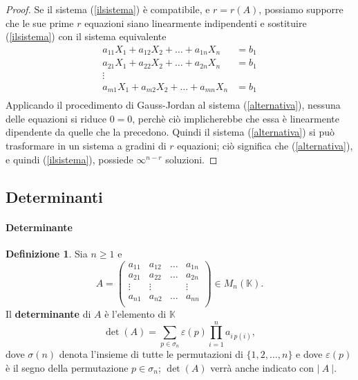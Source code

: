 \documentclass{article}
\theoremstyle{plain}
\theoremstyle{definition}
\newtheorem{defn}{Definizione}[section]
\theoremstyle{remark}
\begin{document}
\begin{proof}
    Se il sistema (\ref{ilsistema}) è compatibile, e $r=r(A)$, possiamo supporre che le sue prime $r$ equazioni siano linearmente indipendenti e sostituire (\ref{ilsistema}) con il sistema equivalente
    \begin{equation}\label{alternativa}
        \begin{aligned}
            a_{11}X_1+a_{12}X_2+\dots+a_{1n}X_n&=b_1\\
            a_{21}X_1+a_{22}X_2+\dots+a_{2n}X_n&=b_1\\
            \vdots\quad\quad\quad\quad&\\
            a_{m1}X_1+a_{m2}X_2+\dots+a_{mn}X_n&=b_1\\
        \end{aligned}
    \end{equation}
    Applicando il procedimento di Gauss-Jordan al sistema (\ref{alternativa}), nessuna delle equazioni si riduce $0=0$, perchè ciò implicherebbe che essa è linearmente dipendente da quelle che la precedono.
    Quindi il sistema (\ref{alternativa}) si può trasformare in un sistema a gradini di $r$ equazioni; ciò significa che (\ref{alternativa}), e quindi (\ref{ilsistema}), possiede $\infty^{n-r}$ soluzioni.
\end{proof}

\newpage
\subsection{Determinanti}
\vspace{20pt}

\paragraph{Determinante}
\begin{bxthm}
\begin{defn}
    Sia $n\geq1$ e 
    \[A=\begin{pmatrix}
        a_{11}&a_{12}&\dots&a_{1n}\\
        a_{21}&a_{22}&\dots&a_{2n}\\
        \vdots&\vdots&&\vdots\\
        a_{n1}&a_{n2}&\dots&a_{nn}\\
    \end{pmatrix}\in M_n(\mathbb{K}).\]
    Il \textbf{determinante} di $A$ è l'elemento di $\mathbb{K}$
    \begin{equation}\label{det}
        \det(A)=\sum_{p\in\sigma_n}\varepsilon(p)\prod_{i=1}^{n}a_{i\,p(i)},
    \end{equation}
    dove $\sigma(n)$ denota l'insieme di tutte le permutazioni di $\{1,2,\dots,n\}$ e dove $\varepsilon(p)$ è il segno della permutazione $p\in \sigma_n$;
    $\det(A)$ verrà anche indicato con $|\ A\ |$.
\end{defn}
\end{bxthm}
\end{document}
